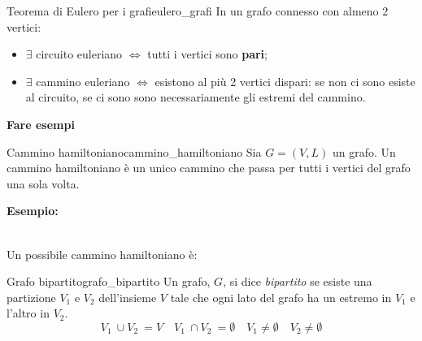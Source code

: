 \documentclass[12pt, letterpaper]{report}
\newcounter{theorem}
\newcounter{definition}
\newcommand{\nmu}{}
\begin{document}
   	\begin{theorem}{\nmu Teorema di Eulero per i grafi}{eulero_grafi}
   		In un grafo connesso con almeno 2 vertici:
   		\begin{itemize}
   			\item $\exists$ circuito euleriano $\iff$ tutti i vertici sono \textbf{pari};
   			\item $\exists$ cammino euleriano $\iff$ esistono al più 2 vertici dispari: se non ci sono esiste al circuito, se ci sono sono necessariamente gli estremi del cammino.
      	\end{itemize}
   	\end{theorem}
   	\textbf{Fare esempi}
   	\begin{definition}{\nmu Cammino hamiltoniano}{cammino_hamiltoniano}
   		Sia $G=(V, L)$ un grafo. Un cammino hamiltoniano è un unico cammino che passa per tutti i vertici del grafo una sola volta.
   	\end{definition}
   	\textbf{Esempio:} \\
   	   	 \\
   	Un possibile cammino hamiltoniano è: \\
   	\begin{definition}{\nmu Grafo bipartito}{grafo_bipartito}
   		Un grafo, $G$, si dice \textit{bipartito} se esiste una partizione $V_1$ e $V_2$ dell'insieme $V$ tale che ogni lato del grafo ha un estremo in $V_1$ e l'altro in $V_2$. \\
   		\[
   		V_1\ \cup V_2\ = V \quad V_1\ \cap V_2\ = \emptyset \quad V_1 \neq \emptyset \quad V_2 \neq \emptyset
   		\]
   	\end{definition}
\end{document}
